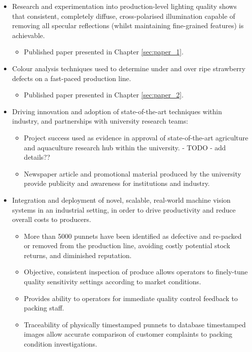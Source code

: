 \documentclass[fleqn,twoside,12pt]{report}
\begin{document}
\begin{itemize}
	\item Research and experimentation into production-level lighting quality shows that consistent, completely diffuse, cross-polarised illumination capable of removing all specular reflections (whilst maintaining fine-grained features) is achievable.
	\begin{itemize}
		\item Published paper presented in Chapter \ref{sec:paper_1}.
	\end{itemize} 
	\item Colour analysis techniques used to determine under and over ripe strawberry defects on a fast-paced production line.
	\begin{itemize}
		\item Published paper presented in Chapter \ref{sec:paper_2}.
	\end{itemize}
	\item Driving innovation and adoption of state-of-the-art techniques within industry, and partnerships with university research teams:
	\begin{itemize}
		\item Project success used as evidence in approval of state-of-the-art agriculture and aquaculture research hub within the university. - TODO - add details??
		\item Newspaper article and promotional material produced by the university provide publicity and awareness for institutions and industry. 
	\end{itemize}
	\item Integration and deployment of novel, scalable, real-world machine vision systems in an industrial setting, in order to drive productivity and reduce overall costs to producers.
	\begin{itemize}
		\item More than 5000 punnets have been identified as defective and re-packed or removed from the production line, avoiding costly potential stock returns, and diminished reputation.
		\item Objective, consistent inspection of produce allows operators to finely-tune quality sensitivity settings according to market conditions.
		\item Provides ability to operators for immediate quality control feedback to packing staff.
		\item Traceability of physically timestamped punnets to database timestamped images allow accurate comparison of customer complaints to packing condition investigations.  

\end{itemize}
\end{itemize}
\end{document}
